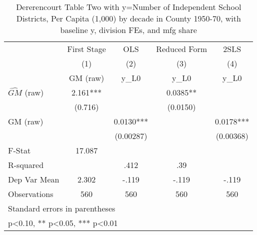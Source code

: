 \begin{table}[htbp]\centering
\def\sym#1{\ifmmode^{#1}\else\(^{#1}\)\fi}
\caption{Dererencourt Table Two with y=Number of Independent School Districts, Per Capita (1,000) by decade in County 1950-70, with baseline y, division FEs, and mfg share}
\begin{tabular}{l*{4}{c}}
\toprule
                    & First Stage   &         OLS   &Reduced Form   &        2SLS   \\
                    &\multicolumn{1}{c}{(1)}&\multicolumn{1}{c}{(2)}&\multicolumn{1}{c}{(3)}&\multicolumn{1}{c}{(4)}\\
                    &\multicolumn{1}{c}{GM  (raw)}&\multicolumn{1}{c}{y\_L0}&\multicolumn{1}{c}{y\_L0}&\multicolumn{1}{c}{y\_L0}\\
\midrule
$\hat{GM}$ (raw)    &       2.161***&               &      0.0385** &               \\
                    &     (0.716)   &               &    (0.0150)   &               \\
\addlinespace
GM  (raw)           &               &      0.0130***&               &      0.0178***\\
                    &               &   (0.00287)   &               &   (0.00368)   \\
\midrule
F-Stat              &      17.087   &               &               &               \\
R-squared           &               &        .412   &         .39   &               \\
Dep Var Mean        &       2.302   &       -.119   &       -.119   &       -.119   \\
Observations        &         560   &         560   &         560   &         560   \\
\bottomrule
\multicolumn{5}{l}{\footnotesize Standard errors in parentheses}\\
\multicolumn{5}{l}{\footnotesize * p<0.10, ** p<0.05, *** p<0.01}\\
\end{tabular}
\end{table}
